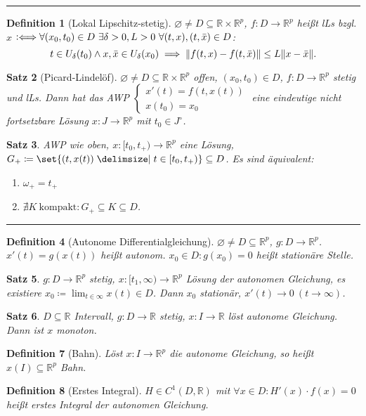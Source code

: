 \documentclass[a4paper]{article}
\newcounter{Sec}
\theoremstyle{marginbreak}
\newtheorem{definition}{Definition}[Sec]
\newtheorem{satz}[definition]{Satz}
\newcommand{\sep}{%
	\rule{\textwidth}{0.3pt}%
	\stepcounter{Sec}%
	}
\newcommand{\defiff}{\mathrel{\vcentcolon\Longleftrightarrow}}
\newcommand{\R}{\mathbb{R}}
\begin{document}
	\sep
	\begin{definition}[Lokal Lipschitz-stetig]
		$\varnothing\neq D\subseteq \R\times\R^p$, $f\colon D\to\R^p$ heißt lLs bzgl. $x$
		$\defiff\forall(x_0, t_0)\in D~\exists\delta>0, L>0~\forall (t, x), (t, \bar{x})\in D$:
		\[
			t\in U_\delta(t_0)\wedge x, \bar{x}\in U_\delta(x_0)\implies\norm{f(t, x)-f(t, \bar{x})}\leq L\norm{x-\bar{x}}.
		\]
	\end{definition}
	\begin{satz}[Picard-Lindelöf]
		$\varnothing\neq D\subseteq\R\times\R^p$ offen, $(x_0, t_0)\in D$, $f\colon D\to\R^p$
		stetig und lLs. Dann hat das AWP $\begin{cases}x'(t)=f(t, x(t))\\x(t_0)=x_0\end{cases}$
		eine eindeutige nicht fortsetzbare Lösung $x\colon J\to\R^p$ mit $t_0\in J^\circ$.
	\end{satz}
	\begin{satz}
		AWP wie oben, $x\colon [t_0,t_+)\to\R^p$ eine Lösung, $G_+\coloneqq\set{(t, x(t))\given t\in[t_0,t_+)}\subseteq D$.
		Es sind äquivalent:
		\begin{enumerate}[label=(\alph*)]
			\item $\omega_+=t_+$
			\item $\nexists K~\text{kompakt}: G_+\subseteq K\subseteq D$.
		\end{enumerate}
	\end{satz}
	\sep
	\begin{definition}[Autonome Differentialgleichung] %
		$\varnothing\neq D\subseteq \R^p$, $g\colon D\to\R^p$. $x'(t)=g(x(t))$ heißt autonom. $x_0\in D: g(x_0)=0$ heißt
		stationäre Stelle.
	\end{definition}
	\begin{satz}
		$g\colon D\to\R^p$ stetig, $x\colon [t_1,\infty)\to\R^p$ Lösung der autonomen Gleichung,
		es existiere $x_0\coloneqq\lim_{t\in\infty}x(t)\in D$. Dann $x_0$ stationär, $x'(t)\to 0~(t\to\infty)$.
	\end{satz}
	\begin{satz}
		$D\subseteq\R$ Intervall, $g\colon D\to\R$ stetig, $x\colon I\to\R$ löst autonome Gleichung. Dann ist $x$
		monoton.
	\end{satz}
	\begin{definition}[Bahn]
		Löst $x\colon I\to\R^p$ die autonome Gleichung, so heißt $x(I)\subseteq\R^p$ Bahn.
	\end{definition}
	\begin{definition}[Erstes Integral]
		$H\in C^1(D,\R)$ mit $\forall x\in D: H'(x)\cdot f(x)=0$ heißt erstes Integral der autonomen Gleichung.
	\end{definition}
\end{document}
